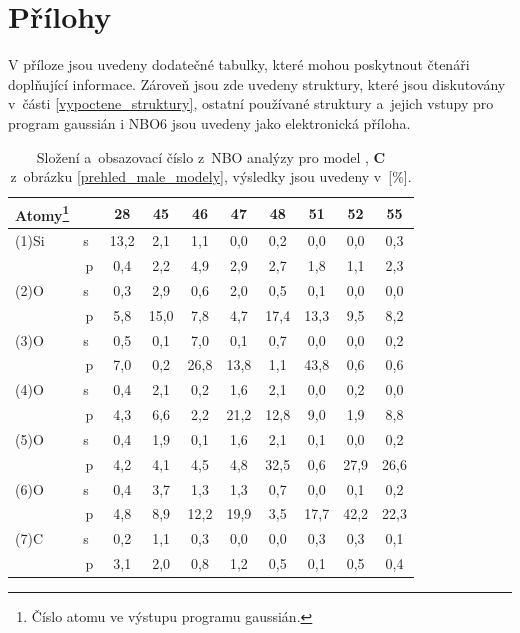 \documentclass[
digital, %
table,   %
nolof,     %
nolot,     %
oneside,
]{fithesis3}
\begin{document}
\chapter{Přílohy}
V příloze jsou uvedeny dodatečné tabulky, které mohou poskytnout čtenáři doplňující informace. Zároveň jsou zde uvedeny struktury, které jsou diskutovány v~části \ref{vypoctene_struktury}, ostatní používané struktury a~jejich vstupy pro program gaussián i NBO6 jsou uvedeny jako elektronická příloha.
\begin{table}[H]
\begin{minipage}{\textwidth}
\caption{Složení a~obsazovací číslo z~NBO analýzy pro model ,  \textbf{C} z~obrázku \ref{prehled_male_modely}, výsledky jsou uvedeny v~[\%].}
\begin{center}
\begin{tabular}{|l|c|c|c|c|c|c|c|c|c|}
\hline
\label{si_ch3_och3_5_MPA}Atomy\footnote{Číslo atomu ve výstupu programu gaussián.}  &  & 28 & 45 & 46 & 47 & 48 & 51 & 52 & 55 \\ \hline
(1)Si & s~& 13,2  & 2,1  & 1,1  & 0,0  & 0,2  & 0,0  & 0,0  & 0,3  \\ \hline
& p & 0,4  & 2,2  & 4,9  & 2,9  & 2,7  & 1,8  & 1,1  & 2,3  \\ \hline
(2)O & s~& 0,3  & 2,9  & 0,6  & 2,0  & 0,5  & 0,1  & 0,0  & 0,0  \\ \hline
& p & 5,8  & 15,0  & 7,8  & 4,7  & 17,4  & 13,3  & 9,5  & 8,2  \\ \hline
(3)O & s~& 0,5  & 0,1  & 7,0  & 0,1  & 0,7  & 0,0  & 0,0  & 0,2  \\ \hline
& p & 7,0  & 0,2  & 26,8  & 13,8  & 1,1  & 43,8  & 0,6  & 0,6  \\ \hline
(4)O & s~& 0,4  & 2,1  & 0,2  & 1,6  & 2,1  & 0,0  & 0,2  & 0,0  \\ \hline
& p & 4,3  & 6,6  & 2,2  & 21,2  & 12,8  & 9,0  & 1,9  & 8,8  \\ \hline
(5)O & s~& 0,4  & 1,9  & 0,1  & 1,6  & 2,1  & 0,1  & 0,0  & 0,2  \\ \hline
& p & 4,2  & 4,1  & 4,5  & 4,8  & 32,5  & 0,6  & 27,9  & 26,6  \\ \hline
(6)O & s~& 0,4  & 3,7  & 1,3  & 1,3  & 0,7  & 0,0  & 0,1  & 0,2  \\ \hline
& p & 4,8  & 8,9  & 12,2  & 19,9  & 3,5  & 17,7  & 42,2  & 22,3  \\ \hline
(7)C & s~& 0,2  & 1,1  & 0,3  & 0,0  & 0,0  & 0,3  & 0,3  & 0,1  \\ \hline
& p & 3,1  & 2,0  & 0,8  & 1,2  & 0,5  & 0,1  & 0,5  & 0,4  \\ \hline
\end{tabular}\end{center}\end{minipage}
\end{table}
\end{document}
